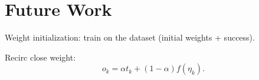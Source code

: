 
\section*{Future Work} 
Weight initialization: train on the dataset (initial weights + success). 

Recirc close weight: 
\begin{equation}
o_k = \alpha t_k + (1-\alpha)f(\eta_k). 
\end{equation} 


